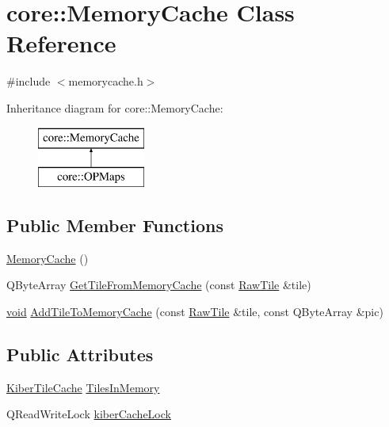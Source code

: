 \hypertarget{classcore_1_1_memory_cache}{\section{core\-:\-:\-Memory\-Cache \-Class \-Reference}
\label{classcore_1_1_memory_cache}
}


{\ttfamily \#include $<$memorycache.\-h$>$}

\-Inheritance diagram for core\-:\-:\-Memory\-Cache\-:\begin{figure}[H]
\begin{center}
\leavevmode
\includegraphics[height=2.000000cm]{classcore_1_1_memory_cache}
\end{center}
\end{figure}
\subsection*{\-Public \-Member \-Functions}
\begin{DoxyCompactItemize}
\item 
\hyperlink{group___o_p_map_widget_gacf3985e0ad4b9b8ec8753ba08bbfe5d4}{\-Memory\-Cache} ()
\item 
\-Q\-Byte\-Array \hyperlink{group___o_p_map_widget_ga7a264bbfd35c0236a10afa3c474e689b}{\-Get\-Tile\-From\-Memory\-Cache} (const \hyperlink{classcore_1_1_raw_tile}{\-Raw\-Tile} \&tile)
\item 
\hyperlink{group___u_a_v_objects_plugin_ga444cf2ff3f0ecbe028adce838d373f5c}{void} \hyperlink{group___o_p_map_widget_ga6a459355ac3d41deedd783f9bef0ada8}{\-Add\-Tile\-To\-Memory\-Cache} (const \hyperlink{classcore_1_1_raw_tile}{\-Raw\-Tile} \&tile, const \-Q\-Byte\-Array \&pic)
\end{DoxyCompactItemize}
\subsection*{\-Public \-Attributes}
\begin{DoxyCompactItemize}
\item 
\hyperlink{classcore_1_1_kiber_tile_cache}{\-Kiber\-Tile\-Cache} \hyperlink{group___o_p_map_widget_gaeb53ae92c08d2646f4ecbcf764e7e226}{\-Tiles\-In\-Memory}
\item 
\-Q\-Read\-Write\-Lock \hyperlink{group___o_p_map_widget_ga9c5f2537ff4510c8890590e73ea95b65}{kiber\-Cache\-Lock}
\end{DoxyCompactItemize}



